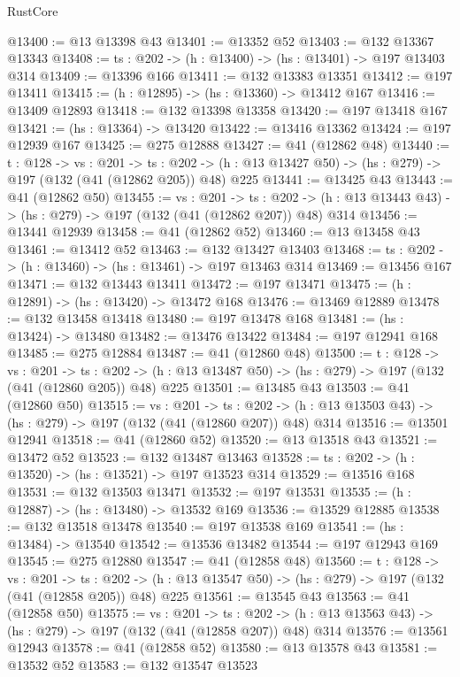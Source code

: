 \begin{lexlean}{RustCore}
\begin{coremodule}
@13400 := @13 @13398 @43
@13401 := @13352 @52
@13403 := @132 @13367 @13343
@13408 := {ts : @202} -> (h : @13400) -> (hs : @13401) -> @197 @13403 @314
@13409 := @13396 @166
@13411 := @132 @13383 @13351
@13412 := @197 @13411
@13415 := (h : @12895) -> (hs : @13360) -> @13412 @167
@13416 := @13409 @12893
@13418 := @132 @13398 @13358
@13420 := @197 @13418 @167
@13421 := (hs : @13364) -> @13420
@13422 := @13416 @13362
@13424 := @197 @12939 @167
@13425 := @275 @12888
@13427 := @41 (@12862 @48)
@13440 := {t : @128} ->
  {vs : @201} ->
  {ts : @202} -> (h : @13 @13427 @50) -> (hs : @279) -> @197 (@132 (@41 (@12862 @205)) @48) @225
@13441 := @13425 @43
@13443 := @41 (@12862 @50)
@13455 := {vs : @201} ->
  {ts : @202} -> (h : @13 @13443 @43) -> (hs : @279) -> @197 (@132 (@41 (@12862 @207)) @48) @314
@13456 := @13441 @12939
@13458 := @41 (@12862 @52)
@13460 := @13 @13458 @43
@13461 := @13412 @52
@13463 := @132 @13427 @13403
@13468 := {ts : @202} -> (h : @13460) -> (hs : @13461) -> @197 @13463 @314
@13469 := @13456 @167
@13471 := @132 @13443 @13411
@13472 := @197 @13471
@13475 := (h : @12891) -> (hs : @13420) -> @13472 @168
@13476 := @13469 @12889
@13478 := @132 @13458 @13418
@13480 := @197 @13478 @168
@13481 := (hs : @13424) -> @13480
@13482 := @13476 @13422
@13484 := @197 @12941 @168
@13485 := @275 @12884
@13487 := @41 (@12860 @48)
@13500 := {t : @128} ->
  {vs : @201} ->
  {ts : @202} -> (h : @13 @13487 @50) -> (hs : @279) -> @197 (@132 (@41 (@12860 @205)) @48) @225
@13501 := @13485 @43
@13503 := @41 (@12860 @50)
@13515 := {vs : @201} ->
  {ts : @202} -> (h : @13 @13503 @43) -> (hs : @279) -> @197 (@132 (@41 (@12860 @207)) @48) @314
@13516 := @13501 @12941
@13518 := @41 (@12860 @52)
@13520 := @13 @13518 @43
@13521 := @13472 @52
@13523 := @132 @13487 @13463
@13528 := {ts : @202} -> (h : @13520) -> (hs : @13521) -> @197 @13523 @314
@13529 := @13516 @168
@13531 := @132 @13503 @13471
@13532 := @197 @13531
@13535 := (h : @12887) -> (hs : @13480) -> @13532 @169
@13536 := @13529 @12885
@13538 := @132 @13518 @13478
@13540 := @197 @13538 @169
@13541 := (hs : @13484) -> @13540
@13542 := @13536 @13482
@13544 := @197 @12943 @169
@13545 := @275 @12880
@13547 := @41 (@12858 @48)
@13560 := {t : @128} ->
  {vs : @201} ->
  {ts : @202} -> (h : @13 @13547 @50) -> (hs : @279) -> @197 (@132 (@41 (@12858 @205)) @48) @225
@13561 := @13545 @43
@13563 := @41 (@12858 @50)
@13575 := {vs : @201} ->
  {ts : @202} -> (h : @13 @13563 @43) -> (hs : @279) -> @197 (@132 (@41 (@12858 @207)) @48) @314
@13576 := @13561 @12943
@13578 := @41 (@12858 @52)
@13580 := @13 @13578 @43
@13581 := @13532 @52
@13583 := @132 @13547 @13523

\end{coremodule}
\end{lexlean}
